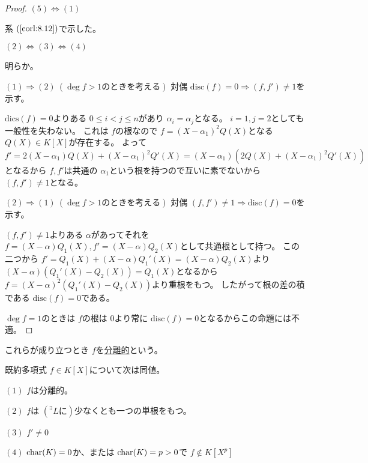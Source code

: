 \documentclass[../master_galois_theory]{subfiles}
\begin{document}
\begin{proof}
  $(5) \Leftrightarrow (1)$

  系 $(\mathrm{\ref{corl:8.12}})$で示した。

  $(2) \Leftrightarrow (3) \Leftrightarrow (4)$

  明らか。

  $(1) \Rightarrow (2) \  (\deg f > 1のときを考える)$
  対偶 $\mathrm{disc}(f) = 0 \Rightarrow (f,f') \neq 1$を示す。

  $\mathrm{dics}(f) = 0$よりある $0 \leq i < j \leq n$があり
  $\alpha_i = \alpha_j$となる。
  $i = 1 , j = 2$としても一般性を失わない。
  これは $f$の根なので $f = (X - \alpha_1)^2 Q(X)$となる $Q(X) \in K[X]$が存在する。
  よって $f' = 2(X - \alpha_1)Q(X) + (X - \alpha_1)^2 Q'(X) = (X - \alpha_1)(2 Q(X) + (X - \alpha_1)^2 Q'(X))$となるから
  $f , f'$は共通の $\alpha_1$という根を持つので互いに素でないから
  $(f,f') \neq 1$となる。

  $(2) \Rightarrow (1) \  (\deg f > 1のときを考える)$
  対偶 $(f,f') \neq 1 \Rightarrow \mathrm{disc}(f) = 0$を示す。

  $(f,f') \neq 1$よりある $\alpha$があってそれを
  $f = (X - \alpha) Q_1(X) , f' = (X - \alpha) Q_2(X)$として共通根として持つ。
  この二つから $f' = Q_1(X) + (X - \alpha)Q_1'(X) = (X - \alpha) Q_2(X)$より
  $(X - \alpha)(Q_1'(X) - Q_2(X)) = Q_1(X)$となるから
  $f = (X - \alpha)^2 (Q_1'(X) - Q_2(X))$より重根をもつ。
  したがって根の差の積である $\mathrm{disc}(f) = 0$である。

  $\deg f = 1$のときは $f$の根は $0$より常に $\mathrm{disc}(f) = 0$となるからこの命題には不適。
\end{proof}

\begin{defi}
  これらが成り立つとき $f$を\underline{分離的}という。
\end{defi}

\begin{prop} \label{prop:9.3}
  既約多項式 $f \in K[X]$について次は同値。

  $(1)$
  $f$は分離的。

  $(2)$
  $f$は $({}^\exists L に)$少なくとも一つの単根をもつ。

  $(3)$
  $f' \neq 0$

  $(4)$
  $\mathrm{char}(K) = 0$か、または $\mathrm{char}(K) = p > 0$で $f \notin K[X^p]$
\end{prop}
\end{document}
